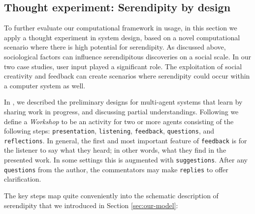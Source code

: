 \subsection{Thought experiment:  Serendipity by design} \label{sec:ww}

To further evaluate our computational framework in usage, in this
section we apply a thought experiment in system design, based on a
novel computational scenario where there is high potential for
serendipity.  As discussed above, sociological factors can influence
serendipitous discoveries on a social scale.  In our two case studies,
user input played a significant role.  The exploitation of social
creativity and feedback can create scenarios where serendipity could
occur within a computer system as well.

In \cite{poetry-workshop}, we described the preliminary designs for
multi-agent systems that learn by sharing work in progress, and
discussing partial understandings.  
%
Following 
we define a \emph{Workshop} to be an activity for two or more agents
consisting of the following steps:
{\tt presentation}, {\tt listening}, {\tt feedback}, {\tt questions},
and {\tt reflections}.  In general, the first and most important
feature of {\tt feedback} is for the listener to say what they heard;
in other words, what they find in the presented work.  In some
settings this is augmented with {\tt suggestions}.  After any {\tt
  questions} from the author, the commentators may make {\tt replies}
to offer clarification.

The key steps map quite conveniently into the schematic description of serendipity that we introduced in Section \ref{sec:our-model}:


